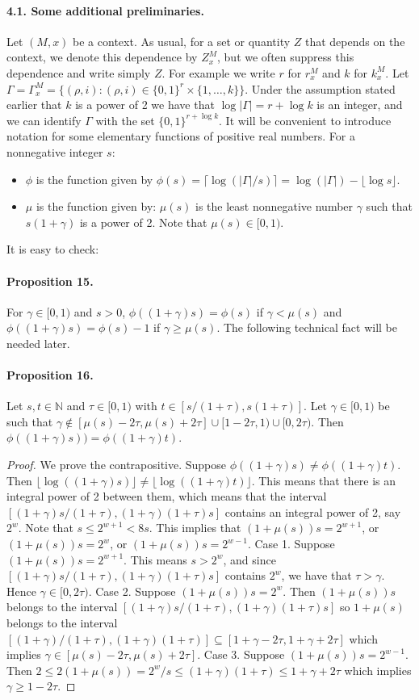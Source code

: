 \paragraph{4.1. Some additional preliminaries.}
Let $(M,x)$ be a context. As usual, for a set or quantity $Z$ that depends on the context, we denote this dependence by $Z_x^M$, but we often suppress this dependence and write simply $Z$. For example we write $r$ for $r_x^M$ and $k$ for $k_x^M$.
Let $\Gamma=\Gamma_x^M=\{(\rho,i):(\rho,i)\in\{0,1\}^r\times\{1,\ldots,k\}\}$. Under the assumption stated earlier that $k$ is a power of 2 we have that $\log|\Gamma|=r+\log k$ is an integer, and we can identify $\Gamma$ with the set $\{0,1\}^{r+\log k}$.
It will be convenient to introduce notation for some elementary functions of positive real numbers. For a nonnegative integer $s$:
\begin{itemize}
\item $\phi$ is the function given by $\phi(s)=\lceil\log(|\Gamma|/s)\rceil=\log(|\Gamma|)-\lfloor\log s\rfloor$.
\item $\mu$ is the function given by: $\mu(s)$ is the least nonnegative number $\gamma$ such that $s(1+\gamma)$ is a power of 2. Note that $\mu(s)\in[0,1)$.
\end{itemize}
It is easy to check:
\paragraph{Proposition 15.}
For $\gamma\in[0,1)$ and $s>0$, $\phi((1+\gamma)s)=\phi(s)$ if $\gamma<\mu(s)$ and $\phi((1+\gamma)s)=\phi(s)-1$ if $\gamma\geq\mu(s)$.
The following technical fact will be needed later.
\paragraph{Proposition 16.}
Let $s,t\in\mathbb N$ and $\tau\in[0,1)$ with $t\in[s/(1+\tau),s(1+\tau)]$. Let $\gamma\in[0,1)$ be such that $\gamma\notin[\mu(s)-2\tau,\mu(s)+2\tau]\cup[1-2\tau,1)\cup[0,2\tau)$. Then $\phi((1+\gamma)s))=\phi((1+\gamma)t)$.
\begin{proof}
We prove the contrapositive. Suppose $\phi((1+\gamma)s)\neq\phi((1+\gamma)t)$. Then $\lfloor\log((1+\gamma)s)\rfloor\neq\lfloor\log((1+\gamma)t)\rfloor$. This means that there is an integral power of 2 between them, which means that the interval $[(1+\gamma)s/(1+\tau),(1+\gamma)(1+\tau)s]$ contains an integral power of 2, say $2^w$. Note that $s\leq2^{w+1}<8s$. This implies that $(1+\mu(s))s=2^{w+1}$, or $(1+\mu(s))s=2^w$, or $(1+\mu(s))s=2^{w-1}$.
Case 1. Suppose $(1+\mu(s))s=2^{w+1}$. This means $s>2^w$, and since $[(1+\gamma)s/(1+\tau),(1+\gamma)(1+\tau)s]$ contains $2^w$, we have that $\tau>\gamma$. Hence $\gamma\in[0,2\tau)$.
Case 2. Suppose $(1+\mu(s))s=2^w$. Then $(1+\mu(s))s$ belongs to the interval $[(1+\gamma)s/(1+\tau),(1+\gamma)(1+\tau)s]$ so $1+\mu(s)$ belongs to the interval $[(1+\gamma)/(1+\tau),(1+\gamma)(1+\tau)]\subseteq[1+\gamma-2\tau,1+\gamma+2\tau]$ which implies $\gamma\in[\mu(s)-2\tau,\mu(s)+2\tau]$.
Case 3. Suppose $(1+\mu(s))s=2^{w-1}$. Then $2\leq2(1+\mu(s))=2^w/s\leq(1+\gamma)(1+\tau)\leq1+\gamma+2\tau$ which implies $\gamma\geq1-2\tau$.
\end{proof}
